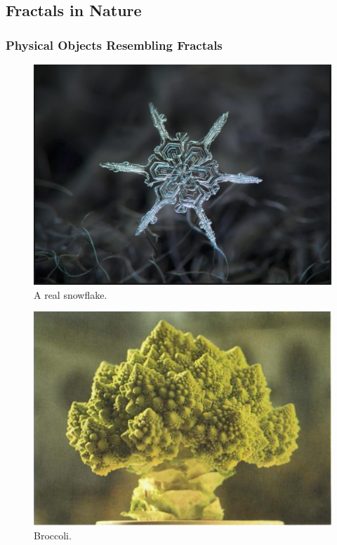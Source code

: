 \subsection{Fractals in Nature}
\subsubsection{Physical Objects Resembling Fractals}
\begin{figure}[h!]
    \includegraphics[width=\linewidth]{Pictures/real_snowflake.png}
    \caption{A real snowflake.}
    \label{fig:real_snowflake}
\end{figure}
\begin{figure}[h!]
    \includegraphics[width=\linewidth]{Pictures/broccoli.png}
    \caption{Broccoli.}
    \label{fig:broccoli}
\end{figure}
